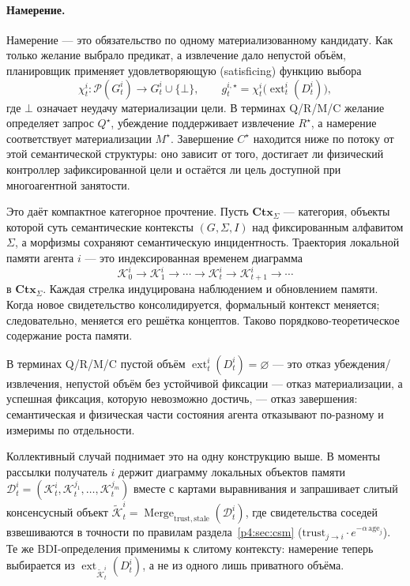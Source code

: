\documentclass{article}
\begin{document}
\paragraph{Намерение.} Намерение --- это обязательство по одному
материализованному кандидату. Как только желание выбрало предикат, а
извлечение дало непустой объём, планировщик применяет
удовлетворяющую (satisficing) функцию выбора
\[
\chi_t^i:\mathcal{P}(G_t^i)\rightarrow G_t^i\cup\{\bot\},
\qquad
g_t^{i,\star}=\chi_t^i\!\big(\operatorname{ext}_t^i(D_t^i)\big),
\]
где $\bot$ означает неудачу материализации цели. В терминах Q/R/M/C
желание определяет запрос $Q^\star$, убеждение поддерживает извлечение
$R^\star$, а намерение соответствует материализации $M^\star$.
Завершение $C^\star$ находится ниже по потоку от этой семантической
структуры: оно зависит от того, достигает ли физический контроллер
зафиксированной цели и остаётся ли цель доступной при многоагентной
занятости.

Это даёт компактное категорное прочтение. Пусть $\mathbf{Ctx}_\Sigma$
--- категория, объекты которой суть семантические контексты
$(G,\Sigma,I)$ над фиксированным алфавитом $\Sigma$, а морфизмы
сохраняют семантическую инцидентность. Траектория локальной памяти
агента $i$ --- это индексированная временем диаграмма
\[
\mathcal{K}_0^i\rightarrow\mathcal{K}_1^i\rightarrow\cdots
\rightarrow\mathcal{K}_t^i\rightarrow\mathcal{K}_{t+1}^i\rightarrow\cdots
\]
в $\mathbf{Ctx}_\Sigma$. Каждая стрелка индуцирована наблюдением и
обновлением памяти. Когда новое свидетельство консолидируется,
формальный контекст меняется; следовательно, меняется его решётка
концептов. Таково порядково-теоретическое содержание роста памяти.

В терминах Q/R/M/C пустой объём
$\operatorname{ext}_t^i(D_t^i)=\varnothing$ --- это отказ
убеждения/извлечения, непустой объём без устойчивой фиксации --- отказ
материализации, а успешная фиксация, которую невозможно достичь, ---
отказ завершения: семантическая и физическая части состояния агента
отказывают по-разному и измеримы по отдельности.

Коллективный случай поднимает это на одну конструкцию выше. В моменты
рассылки получатель $i$ держит диаграмму локальных объектов памяти
$\mathcal{D}_t^i=(\mathcal{K}_t^i,\mathcal{K}_t^{j_1},\ldots,
\mathcal{K}_t^{j_m})$ вместе с картами выравнивания и запрашивает
слитый консенсусный объект
$\widetilde{\mathcal{K}}_t^i=\operatorname{Merge}_{\mathrm{trust},
\mathrm{stale}}(\mathcal{D}_t^i)$, где свидетельства соседей
взвешиваются в точности по правилам раздела~\ref{p4:sec:csm}
($\mathrm{trust}_{j\to i}\cdot e^{-\alpha\,\mathrm{age}_j}$). Те же
BDI-определения применимы к слитому контексту: намерение теперь
выбирается из $\operatorname{ext}_{\widetilde{\mathcal{K}}_t^i}(D_t^i)$,
а не из одного лишь приватного объёма.
\end{document}
